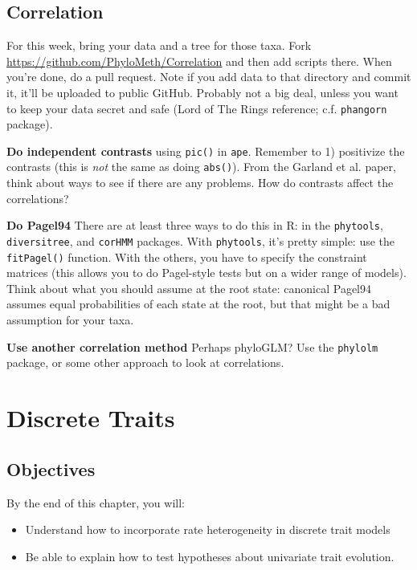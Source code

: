 \documentclass[]{book}
\providecommand{\tightlist}{%
  \setlength{\itemsep}{0pt}\setlength{\parskip}{0pt}}
\theoremstyle{definition}
\theoremstyle{definition}
\theoremstyle{remark}
\begin{document}
\section{Correlation}\label{correlation}

For this week, bring your data and a tree for those taxa. Fork
\url{https://github.com/PhyloMeth/Correlation} and then add scripts
there. When you're done, do a pull request. Note if you add data to that
directory and commit it, it'll be uploaded to public GitHub. Probably
not a big deal, unless you want to keep your data secret and safe (Lord
of The Rings reference; c.f. \texttt{phangorn} package).

\textbf{Do independent contrasts} using \texttt{pic()} in \texttt{ape}.
Remember to 1) positivize the contrasts (this is \emph{not} the same as
doing \texttt{abs()}). From the Garland et al. paper, think about ways
to see if there are any problems. How do contrasts affect the
correlations?

\textbf{Do Pagel94} There are at least three ways to do this in R: in
the \texttt{phytools}, \texttt{diversitree}, and \texttt{corHMM}
packages. With \texttt{phytools}, it's pretty simple: use the
\texttt{fitPagel()} function. With the others, you have to specify the
constraint matrices (this allows you to do Pagel-style tests but on a
wider range of models). Think about what you should assume at the root
state: canonical Pagel94 assumes equal probabilities of each state at
the root, but that might be a bad assumption for your taxa.

\textbf{Use another correlation method} Perhaps phyloGLM? Use the
\texttt{phylolm} package, or some other approach to look at
correlations.

\chapter{Discrete Traits}\label{discrete-traits}

\section{Objectives}\label{objectives-2}

By the end of this chapter, you will:

\begin{itemize}
\tightlist
\item
  Understand how to incorporate rate heterogeneity in discrete trait
  models
\item
  Be able to explain how to test hypotheses about univariate trait
  evolution.
\end{itemize}
\end{document}
